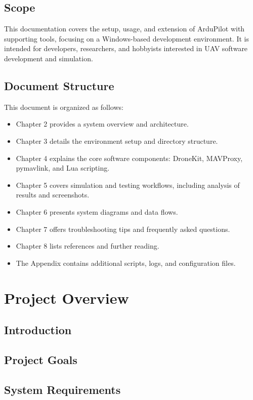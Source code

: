 \documentclass[12pt,a4paper]{report}
\begin{document}
\section{Scope}
This documentation covers the setup, usage, and extension of ArduPilot with supporting tools, focusing on a Windows-based development environment. It is intended for developers, researchers, and hobbyists interested in UAV software development and simulation.

\section{Document Structure}
This document is organized as follows:
\begin{itemize}
    \item Chapter 2 provides a system overview and architecture.
    \item Chapter 3 details the environment setup and directory structure.
    \item Chapter 4 explains the core software components: DroneKit, MAVProxy, pymavlink, and Lua scripting.
    \item Chapter 5 covers simulation and testing workflows, including analysis of results and screenshots.
    \item Chapter 6 presents system diagrams and data flows.
    \item Chapter 7 offers troubleshooting tips and frequently asked questions.
    \item Chapter 8 lists references and further reading.
    \item The Appendix contains additional scripts, logs, and configuration files.
\end{itemize}


\chapter{Project Overview}
\section{Introduction}
\section{Project Goals}
\section{System Requirements}
\end{document}
